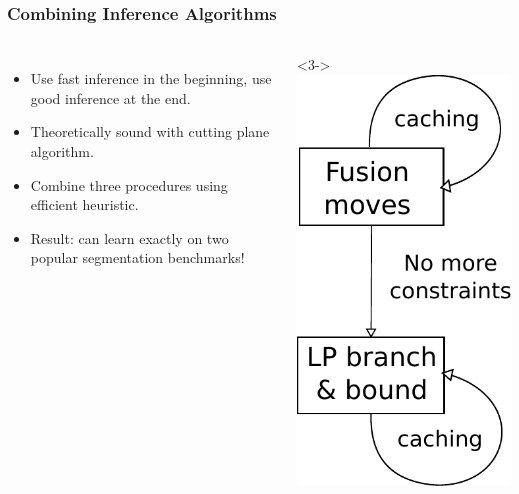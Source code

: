 \documentclass[final,ignorenonframetext,compress]{beamer}
\begin{document}
\begin{frame}
    \frametitle{Combining Inference Algorithms}
    \begin{columns}
        \begin{itemize}
            \item<1-> Use fast inference in the beginning, use good inference at the end.
            \item<2-> Theoretically sound with cutting plane algorithm.
            \item<3-> Combine three procedures using efficient heuristic.
            \item<4-> Result: can learn exactly on two popular segmentation benchmarks!
        \end{itemize}
        \begin{visibleenv}<3->
            \includegraphics[width=.7\linewidth]{images/inference_algs}
        \end{visibleenv}
    \end{columns}
\end{frame}
\end{document}
